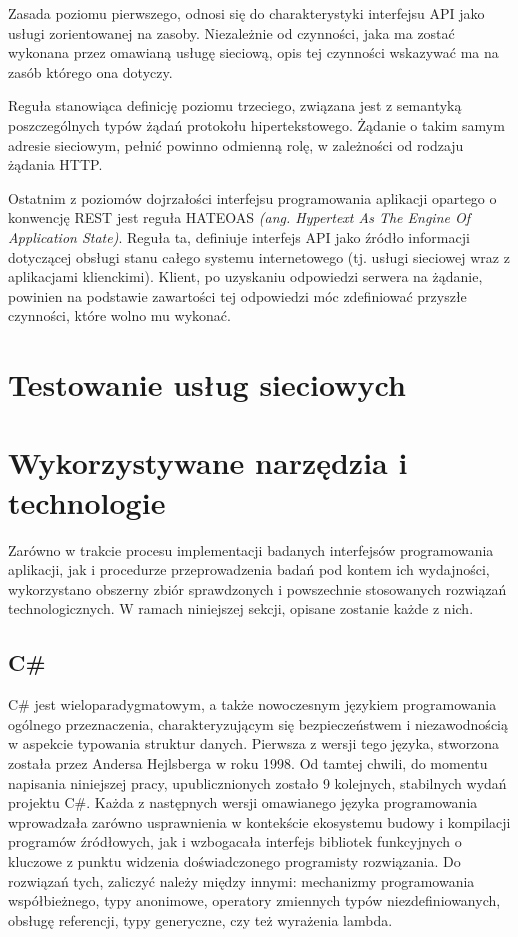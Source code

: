 Zasada poziomu pierwszego, odnosi się do charakterystyki interfejsu API jako usługi zorientowanej na zasoby. Niezależnie od czynności, jaka ma zostać wykonana przez omawianą usługę sieciową, opis tej czynności wskazywać ma na zasób którego ona dotyczy.

Reguła stanowiąca definicję poziomu trzeciego, związana jest z semantyką poszczególnych typów żądań protokołu hipertekstowego. Żądanie o takim samym adresie sieciowym, pełnić powinno odmienną rolę, w zależności od rodzaju żądania HTTP.

Ostatnim z poziomów dojrzałości interfejsu programowania aplikacji opartego o konwencję REST jest reguła HATEOAS \textit{(ang. Hypertext As The Engine Of Application State)}. Reguła ta, definiuje interfejs API jako źródło informacji dotyczącej obsługi stanu całego systemu internetowego (tj. usługi sieciowej wraz z aplikacjami klienckimi). Klient, po uzyskaniu odpowiedzi serwera na żądanie, powinien na podstawie zawartości tej odpowiedzi móc zdefiniować przyszłe czynności, które wolno mu wykonać.  

\section{Testowanie usług sieciowych}
\section{Wykorzystywane narzędzia i technologie}
Zarówno w trakcie procesu implementacji badanych interfejsów programowania aplikacji, jak i procedurze przeprowadzenia badań pod kontem ich wydajności, wykorzystano obszerny zbiór sprawdzonych i powszechnie stosowanych rozwiązań technologicznych. W ramach niniejszej sekcji, opisane zostanie każde z nich.

\subsection*{C\#}
C\# jest wieloparadygmatowym, a także nowoczesnym językiem programowania ogólnego przeznaczenia, charakteryzującym się bezpieczeństwem i niezawodnością w aspekcie typowania struktur danych. Pierwsza z wersji tego języka, stworzona została przez Andersa Hejlsberga w roku 1998. Od tamtej chwili, do momentu napisania niniejszej pracy, upublicznionych zostało 9 kolejnych,  stabilnych wydań projektu C\#. Każda z następnych wersji omawianego języka programowania wprowadzała zarówno usprawnienia w kontekście ekosystemu budowy i kompilacji programów źródłowych, jak i wzbogacała interfejs bibliotek funkcyjnych o kluczowe z punktu widzenia doświadczonego programisty rozwiązania. Do rozwiązań tych, zaliczyć należy między innymi: mechanizmy programowania współbieżnego, typy anonimowe, operatory zmiennych typów niezdefiniowanych, obsługę referencji, typy generyczne, czy też wyrażenia lambda. 

